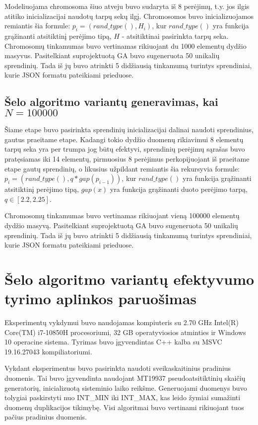 \documentclass{VUMIFInfKursinis}
\begin{document}
Modeliuojama chromosoma šiuo atveju buvo sudaryta iš 8 perėjimų, t.y. jos ilgis atitiko
inicializacijai naudotų tarpų sekų ilgį.
Chromosomos buvo inicializuojamos remiantis šia formule:
$p_i = (rand\_type(), H_i)$, kur $rand\_type()$ yra funkcija grąžinanti atsitiktinį perėjimo tipą, $H$ - atsitiktinai pasirinkta tarpų seka.
Chromosomų tinkamumas buvo vertinamas rikiuojant du 1000 elementų dydžio masyvus.
Pasitelkiant suprojektuotą GA buvo sugeneruota 50 unikalių sprendinių.
Tada iš jų buvo atrinkti 5 didžiausią tinkamumą turintys sprendiniai, kurie JSON formatu pateikiami prieduose. %

\subsection{Šelo algoritmo variantų generavimas, kai $N = 100000$}

Šiame etape buvo pasirinkta sprendinių inicializacijai dalinai naudoti sprendinius, gautus praeitame etape.
Kadangi tokio dydžio duomenų rikiavimui 8 elementų tarpų seka yra per trumpa jog būtų efektyvi,
sprendinių perėjimų sąrašas buvo pratęsiamas iki 14 elementų, pirmuosius 8 perėjimus perkopijuojant iš praeitame etape gautų sprendinių,
o likusius užpildant remiantis šia rekursyvia formule: $p_i = (rand\_type(), q * gap(p_{i-1}))$,
kur $rand\_type()$ yra funkcija grąžinanti atsitiktinį perėjimo tipą, $gap(x)$ yra funkcija grąžinanti duoto perėjimo tarpą, $q \in \left[2.2, 2.25\right]$.

Chromosomų tinkamumas buvo vertinamas rikiuojant vieną 100000 elementų dydžio masyvą.
Pasitelkiant suprojektuotą GA buvo sugeneruota 50 unikalių sprendinių.
Tada iš jų buvo atrinkti 5 didžiausią tinkamumą turintys sprendiniai, kurie JSON formatu pateikiami prieduose. %

\section{Šelo algoritmo variantų efektyvumo tyrimo aplinkos paruošimas}

Eksperimentų vykdymui buvo naudojamas kompiuteris su 2.70 GHz Intel(R) Core(TM) i7-10850H procesoriumi,
32 GB operatyviosios atminties ir Windows 10 operacine sistema.
Tyrimas buvo įgyvendintas C++ kalba su MSVC 19.16.27043 kompiliatoriumi.

Vykdant eksperimentus buvo pasirinkta naudoti sveikaskaitinius pradinius duomenis.
Tai buvo įgyvendinta naudojant MT19937 pseudoatsitiktinių skaičių generatorių, inicializuotą sisteminio laiko reikšme.
Generuojami duomenys buvo tolygiai paskirstyti nuo INT\_MIN iki INT\_MAX, kas leido žymiai sumažinti duomenų duplikacijos tikimybę.
Visi algoritmai buvo vertinami rikiuojant tuos pačius pradinius duomenis.
\end{document}
